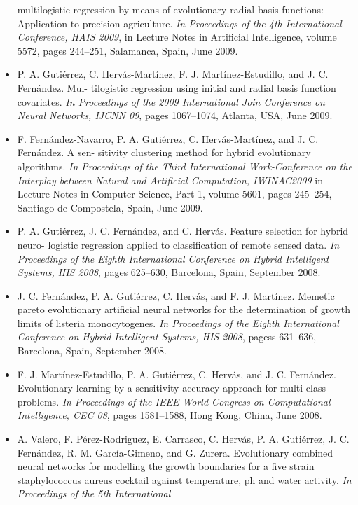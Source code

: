 \begin{itemize}
			multilogistic regression by means of evolutionary radial basis functions: Application to
			precision agriculture. \textit{In Proceedings of the 4th International Conference, HAIS
			2009}, in Lecture Notes in Artificial Intelligence, volume 5572, pages 244–251,
			Salamanca, Spain,	June 2009.
	\item P. A. Gutiérrez, C. Hervás-Martínez, F. J. Martínez-Estudillo, and J. C. Fernández. Mul-
			tilogistic regression using initial and radial basis function covariates. \textit{In
			Proceedings of	the 2009 International Join Conference on Neural Networks, IJCNN 09},
			pages 1067–1074, Atlanta, USA, June 2009.
	\item F. Fernández-Navarro, P. A. Gutiérrez, C. Hervás-Martínez, and J. C. Fernández. A sen-
			sitivity clustering method for hybrid evolutionary algorithms. \textit{In Proceedings of
			the Third International Work-Conference on the Interplay between Natural and
			Artificial Computation, IWINAC2009} in Lecture Notes in Computer Science, Part 1,
			volume 5601, pages	245–254, Santiago de Compostela, Spain, June 2009.
	\item P. A. Gutiérrez, J. C. Fernández, and C. Hervás. Feature selection for hybrid neuro-
			logistic regression applied to classification of remote sensed data. \textit{In Proceedings
			of the Eighth International Conference on Hybrid Intelligent Systems, HIS 2008},
			pages 625–630, Barcelona, Spain, September 2008.
	\item J. C. Fernández, P. A. Gutiérrez, C. Hervás, and F. J. Martínez. Memetic pareto
			evolutionary artificial neural networks for the determination of growth limits of listeria
			monocytogenes. \textit{In Proceedings of the Eighth International Conference on
Hybrid Intelligent			Systems, HIS 2008}, pagess 631–636, Barcelona, Spain, September 2008.
	\item F. J. Martínez-Estudillo, P. A. Gutiérrez, C. Hervás, and J. C. Fernández. Evolutionary
			learning by a sensitivity-accuracy approach for multi-class problems. \textit{In
			Proceedings of	the IEEE World Congress on Computational Intelligence, CEC 08}, pages
			1581–1588, Hong Kong, China, June 2008.
	\item A. Valero, F. Pérez-Rodriguez, E. Carrasco, C. Hervás, P. A. Gutiérrez, J. C. Fernández, R.
			M. García-Gimeno, and G. Zurera. Evolutionary combined neural networks for
			modelling the growth boundaries for a five strain staphylococcus aureus cocktail against
			temperature, ph and water activity. \textit{In Proceedings of the 5th International
}
\end{itemize}
